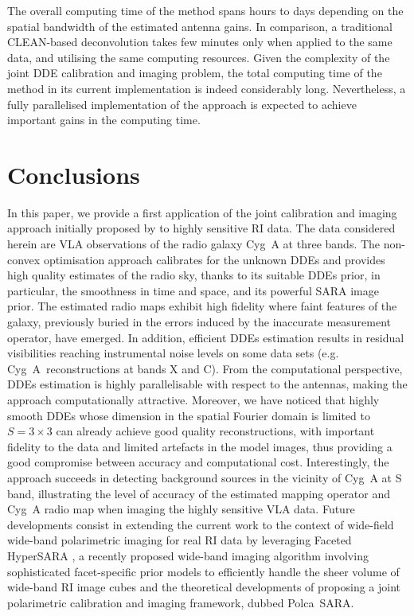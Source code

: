 \documentclass[fleqn,usenatbib]{mnras}
\newcommand{\alg}[1]{\textsc{#1}}
\begin{document}
The overall computing time of the method spans hours to days depending on the spatial bandwidth of the estimated antenna gains. In comparison, a traditional \alg{CLEAN}-based deconvolution takes few minutes only when applied to the same data, and utilising the same computing resources. Given the complexity of the joint DDE calibration and imaging problem, the total computing time of the method in its current implementation is indeed considerably long. Nevertheless, a fully parallelised implementation of the approach is expected to achieve important gains in the computing time. 

\section{Conclusions}\label{sec:cc}
In this paper, we provide a first application of the joint calibration and imaging approach initially proposed by \citet{Repetti2017} to highly sensitive RI data. The data considered herein are {{VLA}} observations of the radio galaxy Cyg~A at three bands. The non-convex optimisation approach calibrates for the unknown DDEs and provides high quality estimates of the radio sky, thanks to its suitable DDEs prior, in particular, the smoothness in time and space, and its powerful SARA image prior. The estimated radio maps exhibit high fidelity where faint features of the galaxy, previously buried in the errors induced by the inaccurate measurement operator, have emerged. In addition, efficient DDEs estimation results in residual visibilities reaching instrumental noise levels on some data sets (e.g. Cyg~A~reconstructions at bands X and C). From the computational perspective, DDEs estimation is highly parallelisable with respect to the antennas, making the approach computationally attractive. Moreover, we have noticed that highly smooth DDEs whose dimension in the spatial Fourier domain is limited to $S=3\times3$ can already achieve good quality reconstructions, with important fidelity to the data and limited artefacts in the model images, thus providing a good compromise between accuracy and computational cost. Interestingly, the approach succeeds in {{detecting}} background sources in the vicinity of Cyg~A at S band, illustrating the level of accuracy of the estimated mapping operator and Cyg~A radio map when imaging the highly sensitive {{VLA}} data. Future developments consist in extending the current work to the context of wide-field wide-band polarimetric imaging for real RI data by leveraging Faceted HyperSARA \citep{Thouvenin20}, a recently proposed wide-band imaging algorithm involving sophisticated facet-specific prior models to efficiently handle the sheer volume of wide-band RI image cubes and the theoretical developments of \citet{Birdi2019} proposing a joint polarimetric calibration and imaging framework, dubbed Polca~SARA. 
\end{document}
